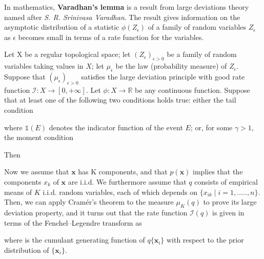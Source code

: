 \documentclass[letterpaper,english,10pt]{article}
\begin{document}
\begin{shaded*}
\begin{thm}
In mathematics, \textbf{Varadhan's lemma} is a result from large deviations theory named after \textit{S. R. Srinivasa Varadhan}. The result gives information on the asymptotic distribution of a statistic $\phi(Z_\epsilon)$ of a family of random variables $Z_\epsilon$ as $\epsilon$ becomes small in terms of a rate function for the variables. 

Let X be a regular topological space; let $(Z_\epsilon)_{\epsilon>0}$ be a family of random variables taking values in $X$; let $\mu_\epsilon$ be the law (probability measure) of $Z_\epsilon$. Suppose that $(\mu_\epsilon)_{\epsilon>0}$ satisfies the large deviation principle with good rate function $\mathscr{I} : X \to [0, +\infty]$. Let $\phi  : X \to  \mathbb{R}$ be any continuous function. Suppose that at least one of the following two conditions holds true: either the tail condition



where $\mathbb{1}(E)$ denotes the indicator function of the event $E$; or, for some $\gamma > 1$, the moment condition

Then

\end{thm}
\end{shaded*}

Now we assume that $\textbf{x}$ has K components, and that $p(\textbf{x})$ implies that the components $x_k$ of $\textbf{x}$ are i.i.d. We furthermore assume that $q$ consists of empirical means of $K$ i.i.d. random variables, each of which depends on $\{x_{ik} \mid i = 1, ..... ,n\}$. Then, we can apply Cramér’s theorem to the measure $\mu_{K}(q)$ to prove its large deviation property, and it turns out that the rate function $\mathscr{I}(q)$ is given in terms of the Fenchel–Legendre transform as


where
is the cumulant generating function of $q\{\textbf{x}_i\}$ with respect to the prior distribution of $\{\textbf{x}_i\}$.
\end{document}

